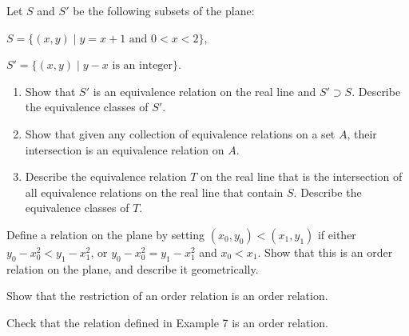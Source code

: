   \begin{exercise}[Munkres 3.5]
    Let $S$ and $S'$ be the following subsets of the plane:

    $S = \{(x, y) \mid y = x + 1 \text{ and } 0 < x < 2\}$,

    $S' = \{(x, y) \mid y - x \text{ is an integer}\}$.
    \begin{enumerate}
      \item Show that $S'$ is an equivalence relation on the real line and $S' \supset S$. Describe the equivalence classes of $S'$.
      \item Show that given any collection of equivalence relations on a set $A$, their intersection is an equivalence relation on $A$.
      \item Describe the equivalence relation $T$ on the real line that is the intersection of all equivalence relations on the real line that contain $S$. Describe the equivalence classes of $T$.
    \end{enumerate}
  \end{exercise}
  \begin{solution}
    
  \end{solution}

  \begin{exercise}[Munkres 3.6]
    Define a relation on the plane by setting $(x_0, y_0) < (x_1, y_1)$ if either $y_0 - x_0^2 < y_1 - x_1^2$, or $y_0 - x_0^2 = y_1 - x_1^2$ and $x_0 < x_1$. Show that this is an order relation on the plane, and describe it geometrically.
  \end{exercise}
  \begin{solution}
    
  \end{solution}

  \begin{exercise}[Munkres 3.7]
    Show that the restriction of an order relation is an order relation.
  \end{exercise}
  \begin{solution}
    
  \end{solution}

  \begin{exercise}[Munkres 3.8]
    Check that the relation defined in Example 7 is an order relation.
  \end{exercise}
  \begin{solution}
    
  \end{solution}

